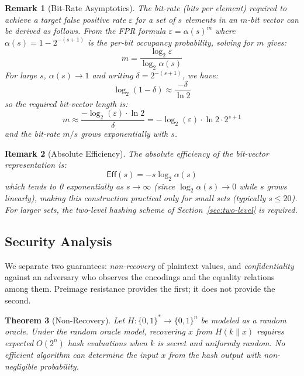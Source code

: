 \documentclass[10pt,conference]{IEEEtran}
\newtheorem{theorem}{Theorem}
\newtheorem{remark}[theorem]{Remark}
\begin{document}
\begin{remark}[Bit-Rate Asymptotics]
\label{rem:bit-rate}
The bit-rate (bits per element) required to achieve a target false positive rate $\varepsilon$ for a set of $s$ elements in an $m$-bit vector can be derived as follows. From the FPR formula $\varepsilon = \alpha(s)^m$ where $\alpha(s) = 1 - 2^{-(s+1)}$ is the per-bit occupancy probability, solving for $m$ gives:
$$m = \frac{\log_2 \varepsilon}{\log_2 \alpha(s)}$$
For large $s$, $\alpha(s) \to 1$ and writing $\delta = 2^{-(s+1)}$, we have:
$$\log_2(1 - \delta) \approx \frac{-\delta}{\ln 2}$$
so the required bit-vector length is:
$$m \approx \frac{-\log_2(\varepsilon) \cdot \ln 2}{\delta} = -\log_2(\varepsilon) \cdot \ln 2 \cdot 2^{s+1}$$
and the bit-rate $m/s$ grows exponentially with $s$.
\end{remark}

\begin{remark}[Absolute Efficiency]
The \emph{absolute efficiency} of the bit-vector representation is:
$$\mathsf{Eff}(s) = -s \log_2 \alpha(s)$$
which tends to 0 exponentially as $s \to \infty$ (since $\log_2 \alpha(s) \to 0$ while $s$ grows linearly), making this construction practical only for small sets (typically $s \leq 20$). For larger sets, the two-level hashing scheme of Section~\ref{sec:two-level} is required.
\end{remark}

\subsection{Security Analysis}

We separate two guarantees: \emph{non-recovery} of plaintext values, and \emph{confidentiality} against an adversary who observes the encodings and the equality relations among them. Preimage resistance provides the first; it does not provide the second.

\begin{theorem}[Non-Recovery]
\label{thm:privacy}
Let $H: \{0,1\}^* \rightarrow \{0,1\}^n$ be modeled as a random oracle. Under the random oracle model, recovering $x$ from $H(k \| x)$ requires expected $O(2^n)$ hash evaluations when $k$ is secret and uniformly random. No efficient algorithm can determine the input $x$ from the hash output with non-negligible probability.
\end{theorem}
\end{document}
